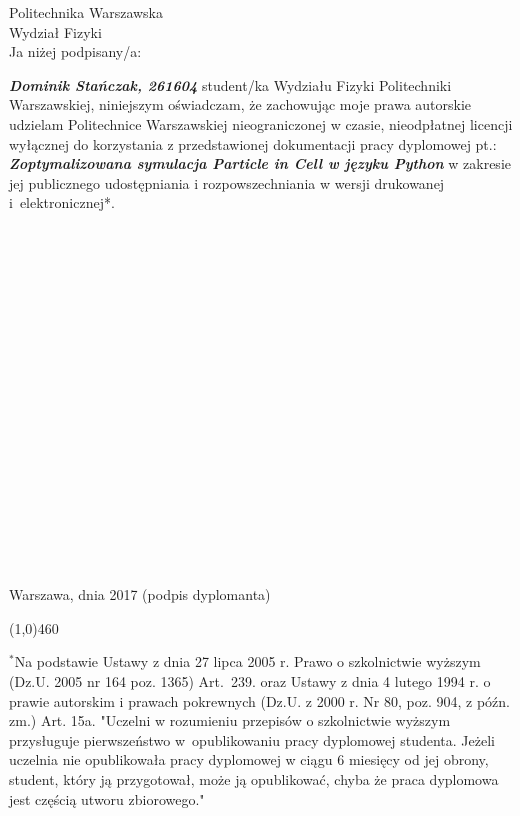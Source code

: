\setcounter{page}{9}
\vspace{-1.5cm}
\begin{flushleft}
	Politechnika Warszawska \\
	Wydział Fizyki \\
	\vspace{0.5cm}
	Ja niżej podpisany/a:
\end{flushleft}
\center \textit{\textbf{Dominik Stańczak, 261604}} %
\justify student/ka Wydziału Fizyki Politechniki Warszawskiej, niniejszym oświadczam, że zachowując moje prawa autorskie udzielam Politechnice Warszawskiej nieograniczonej w czasie, nieodpłatnej licencji wyłącznej do korzystania z przedstawionej dokumentacji pracy dyplomowej pt.:
\center \textit{\textbf{Zoptymalizowana symulacja Particle in Cell w języku Python}} %
\justify w zakresie jej publicznego udostępniania i rozpowszechniania w wersji drukowanej i~elektronicznej*.
\\~\\~\\~\\~\\~\\~\\~\\~\\~\\~\\~\\~\\~\\~\\~\\~\\~\\~\\~\\
Warszawa, dnia 2017 \hfill (podpis dyplomanta) %

\begin{center}
	\color{plum}
	\line(1,0){460}
\end{center}
\footnotesize \noindent $^{*}$Na podstawie Ustawy z dnia 27 lipca 2005 r. Prawo o szkolnictwie wyższym (Dz.U. 2005 nr 164 poz. 1365) Art.~239. oraz Ustawy z dnia 4 lutego 1994 r. o prawie autorskim i prawach pokrewnych (Dz.U. z 2000 r. Nr 80, poz. 904, z późn. zm.) Art. 15a. "Uczelni w rozumieniu przepisów o szkolnictwie wyższym przysługuje pierwszeństwo w~opublikowaniu pracy dyplomowej studenta. Jeżeli uczelnia nie opublikowała pracy dyplomowej w ciągu 6 miesięcy od jej obrony, student, który ją przygotował, może ją opublikować, chyba że praca dyplomowa jest częścią utworu zbiorowego."

\newpage
\thispagestyle{empty}
\phantom{Nothing here}


